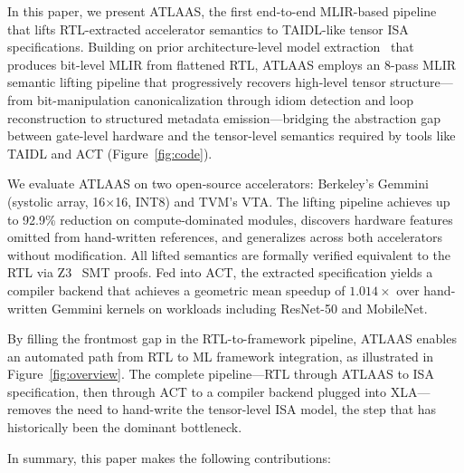 In this paper, we present ATLAAS, the first end-to-end MLIR-based pipeline that lifts RTL-extracted accelerator semantics to TAIDL-like tensor ISA specifications. Building on prior architecture-level model extraction~\cite{autogeniladate, autogenilaiccad} that produces bit-level MLIR from flattened RTL, ATLAAS employs an 8-pass MLIR semantic lifting pipeline that progressively recovers high-level tensor structure---from bit-manipulation canonicalization through idiom detection and loop reconstruction to structured metadata emission---bridging the abstraction gap between gate-level hardware and the tensor-level semantics required by tools like TAIDL and ACT (Figure~\ref{fig:code}).

We evaluate ATLAAS on two open-source accelerators: Berkeley's Gemmini (systolic array, 16$\times$16, INT8) and TVM's VTA. The lifting pipeline achieves up to 92.9\% reduction on compute-dominated modules, discovers hardware features omitted from hand-written references, and generalizes across both accelerators without modification. All lifted semantics are formally verified equivalent to the RTL via Z3~\cite{z3} SMT proofs. Fed into ACT, the extracted specification yields a compiler backend that achieves a geometric mean speedup of $1.014\times$ over hand-written Gemmini kernels on workloads including ResNet-50 and MobileNet.

By filling the frontmost gap in the RTL-to-framework pipeline, ATLAAS enables an automated path from RTL to ML framework integration, as illustrated in Figure~\ref{fig:overview}. The complete pipeline---RTL through ATLAAS to ISA specification, then through ACT to a compiler backend plugged into XLA---removes the need to hand-write the tensor-level ISA model, the step that has historically been the dominant bottleneck.

In summary, this paper makes the following contributions:


